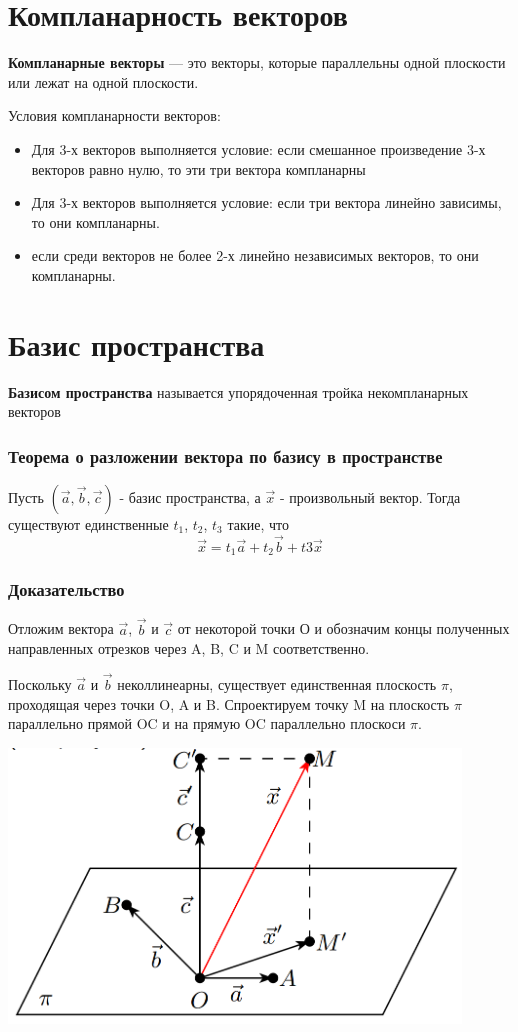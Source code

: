 \documentclass[a4paper]{article}
\begin{document}
\section*{Компланарность векторов}
\textbf{Компланарные векторы} — это векторы, которые параллельны одной плоскости или лежат на одной плоскости. 

Условия компланарности векторов:
\begin{itemize}
\item Для 3-х векторов выполняется условие: если смешанное произведение 3-х векторов равно нулю, то эти три вектора компланарны
\item Для 3-х векторов выполняется условие: если три вектора линейно зависимы, то они компланарны.
\item если среди векторов не более 2-х линейно независимых векторов, то они компланарны.
\end{itemize}
\section*{Базис пространства}
\textbf{Базисом пространства }называется упорядоченная тройка некомпланарных
векторов

\subsubsection*{Теорема о разложении вектора по базису в пространстве}

Пусть $( \vec{a}, \vec{b}, \vec{c})$ - базис пространства, а $\vec{x}$ - произвольный вектор. Тогда существуют единственные $t_1$, $t_2$, $t_3$ такие, что
\begin{equation}
\vec{x} = t_1 \vec{a} + t_2 \vec{b} + t3 \vec{x}
\end{equation}

\subsubsection*{Доказательство}

Отложим вектора $\vec{a}$, $\vec{b}$  и $\vec{c}$ от некоторой точки О и обозначим концы полученных направленных отрезков через A, B, C и M соответственно.

Поскольку $\vec{a}$ и $\vec{b}$ неколлинеарны, существует единственная плоскость $\pi$, проходящая через точки O, A и B. Спроектируем точку M на плоскость $\pi$ параллельно прямой OC и  на прямую OC параллельно плоскоси $\pi$. 

\includegraphics[width=12cm]{t3}
\end{document}
